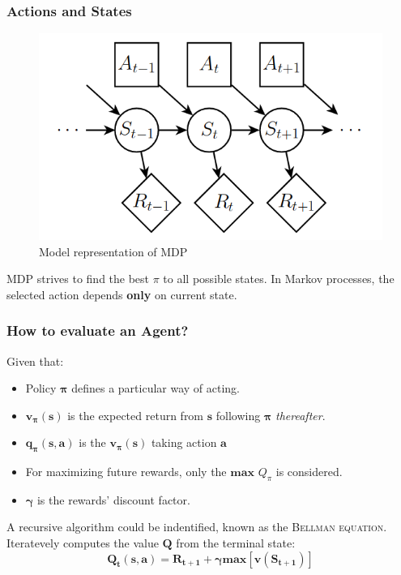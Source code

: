 \documentclass[10pt]{beamer}
\begin{document}
\begin{frame}
	\frametitle{Actions and States}
	\begin{figure}
	\includegraphics[scale=0.2]{img/mdp-states.png}
	\caption{Model representation of MDP \cite{mdp-process}}
	\end{figure}
	MDP strives to find the best $\pi$ to all possible states. 
	In Markov processes, the selected action depends \textbf{only} on current state.
\end{frame}

\begin{frame}
	\frametitle{How to evaluate an Agent?}
	Given that:
	\begin{itemize}
		\item Policy $\pmb{\pi}$ defines a particular way of acting.
		\item $\mathbf{v_π(s)}$ is the expected return from $\mathbf{s}$ following $\pmb{\pi}$ \emph{thereafter}.
		\item $\mathbf{q_π(s, a)}$ is the $\mathbf{v_π(s)}$ taking action $\mathbf{a}$
		\item For maximizing future rewards, only the $\mathbf{max}$ $Q_\pi$ is considered. 
		\item $\pmb{\gamma}$ is the rewards' discount factor. 
	\end{itemize}
	
	A recursive algorithm could be indentified, known as the \textsc{Bellman equation}. Iteratevely computes the value $\mathbf{Q}$ from the terminal state:
	$$ \mathbf{Q_t(s, a) = R_{t + 1} + \gamma max[v(S_{t+1})]} $$

	
		
\end{frame}
\end{document}
